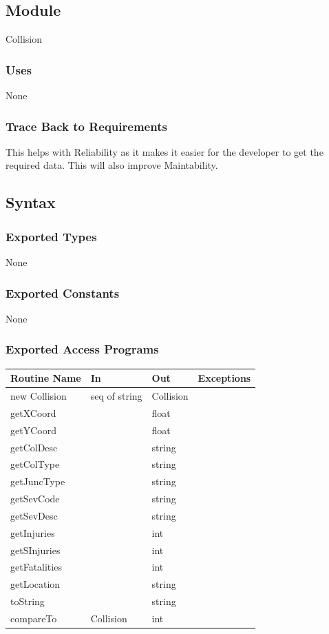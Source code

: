 \documentclass[12pt]{article}
\begin{document}
\subsection*{Module}
Collision

\subsubsection*{Uses}
None

\subsubsection*{Trace Back to Requirements}
This helps with Reliability as it makes it easier for the developer to get the required data. This will also improve Maintability.

\subsection*{Syntax}
\subsubsection*{Exported Types}
None

\subsubsection*{Exported Constants}
None

\subsubsection*{Exported Access Programs}
    \begin{tabular}{|l|l|l|l|}
    \hline
    \textbf{Routine Name} & \textbf{In} & \textbf{Out} & \textbf{Exceptions}\\
    \hline
    new Collision & seq of string & Collision & ~\\
    \hline
    getXCoord & ~ & float & ~\\
    \hline
    getYCoord & ~ & float & ~\\
    \hline
    getColDesc & ~ & string & ~\\
    \hline
    getColType & ~ & string & ~\\
    \hline
    getJuncType & ~ & string & ~\\
    \hline
    getSevCode & ~ & string & ~\\
    \hline
    getSevDesc & ~ & string & ~\\
    \hline
    getInjuries & ~ & int & ~\\
    \hline
    getSInjuries & ~ & int & ~\\
    \hline
    getFatalities & ~ & int & ~\\
    \hline
    getLocation & ~ & string & ~\\
    \hline
    toString & ~ & string & ~\\
    \hline
    compareTo & Collision & int & ~\\
    \hline
    \end{tabular}
    
\end{document}
